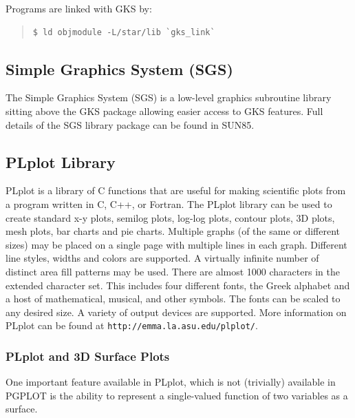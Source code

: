 \documentclass[twoside,11pt]{article}
\newcommand{\htmlref}[2]{#1}
\newcommand{\latex}[1]{#1}
\newcommand{\xref}[3]{#1}
\newcommand{\xlabel}[1]{}
\begin{document}
Programs are linked with GKS by: 

\small
\begin{quote}
\begin{verbatim}
$ ld objmodule -L/star/lib `gks_link` 
\end{verbatim}
\end{quote}
\normalsize

\subsection{\xlabel{sc15_sgs}Simple Graphics System (SGS)\label{sc15_sgs}}

The \xref{Simple Graphics System}{sun85}{} (SGS) is a low-level graphics subroutine library sitting above the \htmlref{GKS}{sc15_gks} package allowing easier access to GKS features. Full details of the SGS library package can be found in \xref{SUN85}{sun85}{}.

\subsection{\xlabel{sc15_plplot}PLplot Library\label{sc15_plplot}}

PLplot is a library of C functions that are useful for making scientific plots from a program written in C, C++, or Fortran. The PLplot library can be used
to create standard x-y plots, semilog plots, log-log plots, contour plots, 3D plots, mesh plots, bar charts and pie charts. Multiple graphs (of the same
or different sizes) may be placed on a single page with multiple lines in each graph. Different line styles, widths and colors are supported. A virtually
infinite number of distinct area fill patterns may be used. There are almost 1000 characters in the extended character set. This includes four different
fonts, the Greek alphabet and a host of mathematical, musical, and other symbols. The fonts can be scaled to any desired size. A variety of output
devices are supported. \latex{More information on PLplot can be found at {\tt http://emma.la.asu.edu/plplot/}.}

\subsubsection{PLplot and 3D Surface Plots}

One important feature available in PLplot, which is not (trivially) available in PGPLOT is the ability to represent a single-valued function of two variables as a surface. 
\end{document}
